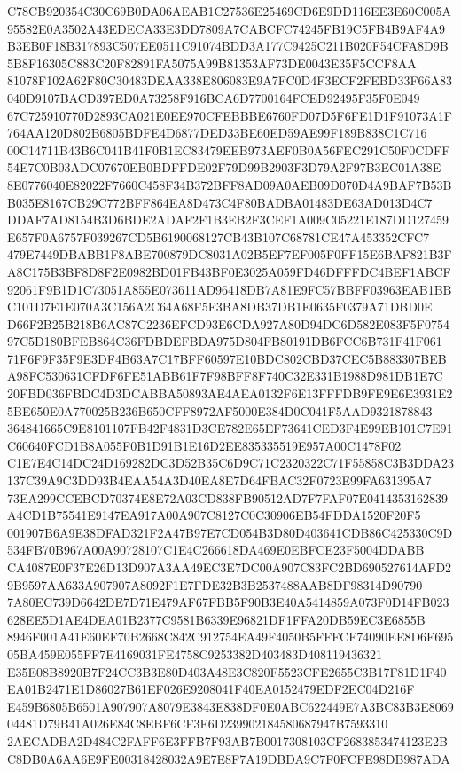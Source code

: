 \documentclass[UTF8,fontset=fandol,zihao=-4,a4paper]{ctexart}
\begin{document}
{{C78CB920354C30C69B0DA06AEAB1C27536E25469CD6E9DD116EE3E60C005A95582E0A3502A43EDECA33E3DD7809A7CABCFC74245FB19C5FB4B9AF4A9
B3EB0F18B317893C507EE0511C91074BDD3A177C9425C211B020F54CFA8D9B5B8F16305C883C20F82891FA5075A99B81353AF73DE0043E35F5CCF8AA
81078F102A62F80C30483DEAA338E806083E9A7FC0D4F3ECF2FEBD33F66A83040D9107BACD397ED0A73258F916BCA6D7700164FCED92495F35F0E049
67C725910770D2893CA021E0EE970CFEBBBE6760FD07D5F6FE1D1F91073A1F764AA120D802B6805BDFE4D6877DED33BE60ED59AE99F189B838C1C716
00C14711B43B6C041B41F0B1EC83479EEB973AEF0B0A56FEC291C50F0CDFF54E7C0B03ADC07670EB0BDFFDE02F79D99B2903F3D79A2F97B3EC01A38E
8E0776040E82022F7660C458F34B372BFF8AD09A0AEB09D070D4A9BAF7B53BB035E8167CB29C772BFF864EA8D473C4F80BADBA01483DE63AD013D4C7
DDAF7AD8154B3D6BDE2ADAF2F1B3EB2F3CEF1A009C05221E187DD127459E657F0A6757F039267CD5B6190068127CB43B107C68781CE47A453352CFC7
479E7449DBABB1F8ABE700879DC8031A02B5EF7EF005F0FF15E6BAF821B3FA8C175B3BF8D8F2E0982BD01FB43BF0E3025A059FD46DFFFDC4BEF1ABCF
92061F9B1D1C73051A855E073611AD96418DB7A81E9FC57BBFF03963EAB1BBC101D7E1E070A3C156A2C64A68F5F3BA8DB37DB1E0635F0379A71DBD0E
D66F2B25B218B6AC87C2236EFCD93E6CDA927A80D94DC6D582E083F5F075497C5D180BFEB864C36FDBDEFBDA975D804FB80191DB6FCC6B731F41F061
71F6F9F35F9E3DF4B63A7C17BFF60597E10BDC802CBD37CEC5B883307BEBA98FC530631CFDF6FE51ABB61F7F98BFF8F740C32E331B1988D981DB1E7C
20FBD036FBDC4D3DCABBA50893AE4AEA0132F6E13FFFDB9FE9E6E3931E25BE650E0A770025B236B650CFF8972AF5000E384D0C041F5AAD9321878843
364841665C9E8101107FB42F4831D3CE782E65EF73641CED3F4E99EB101C7E91C60640FCD1B8A055F0B1D91B1E16D2EE835335519E957A00C1478F02
C1E7E4C14DC24D169282DC3D52B35C6D9C71C2320322C71F55858C3B3DDA23137C39A9C3DD93B4EAA54A3D40EA8E7D64FBAC32F0723E99FA631395A7
73EA299CCEBCD70374E8E72A03CD838FB90512AD7F7FAF07E0414353162839A4CD1B75541E9147EA917A00A907C8127C0C30906EB54FDDA1520F20F5
001907B6A9E38DFAD321F2A47B97E7CD054B3D80D403641CDB86C425330C9D534FB70B967A00A90728107C1E4C266618DA469E0EBFCE23F5004DDABB
CA4087E0F37E26D13D907A3AA49EC3E7DC00A907C83FC2BD690527614AFD29B9597AA633A907907A8092F1E7FDE32B3B2537488AAB8DF98314D90790
7A80EC739D6642DE7D71E479AF67FBB5F90B3E40A5414859A073F0D14FB023628EE5D1AE4DEA01B2377C9581B6339E96821DF1FFA20DB59EC3E6855B
8946F001A41E60EF70B2668C842C912754EA49F4050B5FFFCF74090EE8D6F69505BA459E055FF7E4169031FE4758C9253382D403483D408119436321
E35E08B8920B7F24CC3B3E80D403A48E3C820F5523CFE2655C3B17F81D1F40EA01B2471E1D86027B61EF026E9208041F40EA0152479EDF2EC04D216F
E459B6805B6501A907907A8079E3843E838DF0E0ABC622449E7A3BC83B3E806904481D79B41A026E84C8EBF6CF3F6D239902184580687947B7593310
2AECADBA2D484C2FAFF6E3FFB7F93AB7B0017308103CF2683853474123E2BC8DB0A6AA6E9FE00318428032A9E7E8F7A19DBDA9C7F0FCFE98DB987ADA
}}
\end{document}

